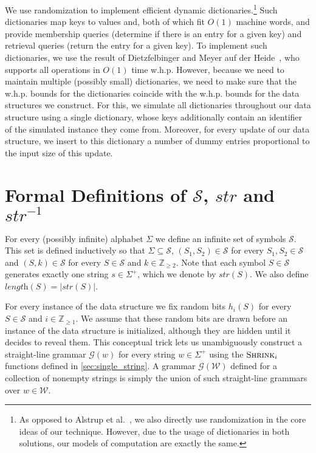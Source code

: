 \documentclass[a4paper]{article}
\theoremstyle{remark}
\newcommand{\symbols}{\mathcal{S}}
\newcommand{\shrink}[1]{\ensuremath{\textsc{Shrink}_{#1}}}
\newcommand{\hs}{h}
\newcommand{\grammar}{\mathcal{G}}
\newcommand{\slength}{\textit{length}}
\newcommand{\sstr}{\textit{str}}
\newcommand{\coll}{\mathcal{W}}
\begin{document}
We use randomization to implement efficient dynamic dictionaries.\footnote{As opposed to Alstrup et al.~\cite{Alstrup}, we also directly use randomization in the core ideas of our technique.
However, due to the usage of dictionaries in both solutions, our models of computation are exactly the same.
}
Such dictionaries map keys to values and, both of which fit $O(1)$ machine words,
and provide membership queries (determine if there is an entry for a given key) and retrieval queries
(return the entry for a given key).
To implement such dictionaries, we use the result of Dietzfelbinger and Meyer auf der Heide~\cite{Dietzfelbinger:1990},
who supports all operations in $O(1)$ time w.h.p.
However, because we need to maintain multiple (possibly small) dictionaries,
we need to make sure that the w.h.p. bounds for the dictionaries coincide with the w.h.p.
bounds for the data structures we construct.
For this, we simulate all dictionaries throughout our data structure using a single dictionary, whose
keys additionally contain an identifier of the simulated instance they come from.
Moreover, for every update of our data structure, we insert to this dictionary a number of dummy entries
proportional to the input size of this update.

\section{Formal Definitions of $\symbols$, $\sstr$ and $\sstr^{-1}$}\label{app:formalsymbols}
For every (possibly infinite) alphabet $\Sigma$ we define an infinite set of symbols $\symbols$.
This set is defined inductively so that $\Sigma \subseteq \symbols$, $(S_1,S_2)\in \symbols$ for every $S_1,S_2\in \symbols$
and $(S,k)\in \symbols$ for every $S\in \symbols$ and $k\in \mathbb{Z}_{\ge 2}$.
Note that each symbol $S\in \symbols$ generates exactly one string $s\in \Sigma^+$, which we denote by $\sstr(S)$.
We also define $\slength(S)=|\sstr(S)|$.

For every instance of the data structure we fix random bits $\hs_i(S)$ for every $S\in \symbols$ and $i\in \mathbb{Z}_{\ge 1}$.
We assume that these random bits are drawn before an instance of the data structure is initialized, although they are hidden until it decides to reveal them.
This conceptual trick lets us unambiguously construct a straight-line grammar $\grammar(w)$ for every string $w\in \Sigma^+$
using the $\shrink{i}$ functions defined in \cref{sec:single_string}.
A grammar $\grammar(\coll)$ defined for a collection of nonempty strings is simply the union of such straight-line grammars
over $w\in \coll$.
\end{document}
